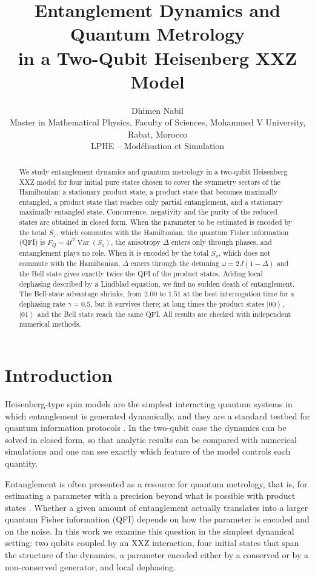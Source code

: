 \documentclass[10.5pt,a4paper]{article}
\title{Entanglement Dynamics and Quantum Metrology\\in a Two-Qubit Heisenberg XXZ Model}
\author{Dhimen Nabil\\[2pt]
\small Master in Mathematical Physics, Faculty of Sciences, Mohammed V University, Rabat, Morocco\\
\small LPHE -- Mod\'elisation et Simulation}
\date{}
\newcommand{\ket}[1]{\left|#1\right\rangle}
\newcommand{\Var}{\operatorname{Var}}
\newcommand{\FQ}{F_Q}
\begin{document}
\maketitle

\begin{abstract}
\noindent We study entanglement dynamics and quantum metrology in a two-qubit Heisenberg XXZ model for four initial pure states chosen to cover the symmetry sectors of the Hamiltonian: a stationary product state, a product state that becomes maximally entangled, a product state that reaches only partial entanglement, and a stationary maximally entangled state. Concurrence, negativity and the purity of the reduced states are obtained in closed form. When the parameter to be estimated is encoded by the total $S_z$, which commutes with the Hamiltonian, the quantum Fisher information (QFI) is $\FQ=4t^2\Var(S_z)$, the anisotropy $\Delta$ enters only through phases, and entanglement plays no role. When it is encoded by the total $S_x$, which does not commute with the Hamiltonian, $\Delta$ enters through the detuning $\omega=2J(1-\Delta)$ and the Bell state gives exactly twice the QFI of the product states. Adding local dephasing described by a Lindblad equation, we find no sudden death of entanglement. The Bell-state advantage shrinks, from $2.00$ to $1.51$ at the best interrogation time for a dephasing rate $\gamma=0.5$, but it survives there; at long times the product states $\ket{00}$, $\ket{01}$ and the Bell state reach the same QFI. All results are checked with independent numerical methods.
\end{abstract}

\section{Introduction}

Heisenberg-type spin models are the simplest interacting quantum systems in which entanglement is generated dynamically, and they are a standard testbed for quantum information protocols \cite{Horodecki2009}. In the two-qubit case the dynamics can be solved in closed form, so that analytic results can be compared with numerical simulations and one can see exactly which feature of the model controls each quantity.

Entanglement is often presented as a resource for quantum metrology, that is, for estimating a parameter with a precision beyond what is possible with product states \cite{Giovannetti2011}. Whether a given amount of entanglement actually translates into a larger quantum Fisher information (QFI) depends on how the parameter is encoded and on the noise. In this work we examine this question in the simplest dynamical setting: two qubits coupled by an XXZ interaction, four initial states that span the structure of the dynamics, a parameter encoded either by a conserved or by a non-conserved generator, and local dephasing.
\end{document}
